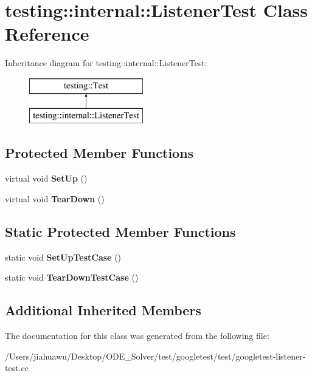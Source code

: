 \hypertarget{classtesting_1_1internal_1_1_listener_test}{}\section{testing\+:\+:internal\+:\+:Listener\+Test Class Reference}
\label{classtesting_1_1internal_1_1_listener_test}
Inheritance diagram for testing\+:\+:internal\+:\+:Listener\+Test\+:\begin{figure}[H]
\begin{center}
\leavevmode
\includegraphics[height=2.000000cm]{classtesting_1_1internal_1_1_listener_test}
\end{center}
\end{figure}
\subsection*{Protected Member Functions}
\begin{DoxyCompactItemize}
\item 
\mbox{\label{classtesting_1_1internal_1_1_listener_test_ace3dbe36b705ddf320518e6cdd919bc8}} 
virtual void {\bfseries Set\+Up} ()
\item 
\mbox{\label{classtesting_1_1internal_1_1_listener_test_ad112535025d668e3ea14e71d8741c810}} 
virtual void {\bfseries Tear\+Down} ()
\end{DoxyCompactItemize}
\subsection*{Static Protected Member Functions}
\begin{DoxyCompactItemize}
\item 
\mbox{\label{classtesting_1_1internal_1_1_listener_test_a7cbc298576e584b4021d0375204b7391}} 
static void {\bfseries Set\+Up\+Test\+Case} ()
\item 
\mbox{\label{classtesting_1_1internal_1_1_listener_test_aa35b5f1c6235f0fe98aa2c7f35bb8fe1}} 
static void {\bfseries Tear\+Down\+Test\+Case} ()
\end{DoxyCompactItemize}
\subsection*{Additional Inherited Members}


The documentation for this class was generated from the following file\+:\begin{DoxyCompactItemize}
\item 
/\+Users/jiahuawu/\+Desktop/\+O\+D\+E\+\_\+\+Solver/test/googletest/test/googletest-\/listener-\/test.\+cc\end{DoxyCompactItemize}
